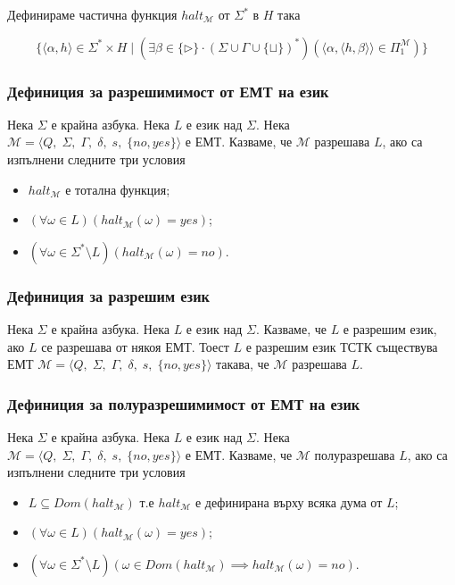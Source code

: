 \documentclass[14pt]{extarticle}
\begin{document}
Дефинираме частична функция \(halt_{\mathcal M}\) от \(\Sigma^*\) в \(H\) така

\[\{ \langle \alpha, h \rangle \in \Sigma^* \times H \mid (\exists \beta \in \{\triangleright\} \cdot (\Sigma \cup \Gamma \cup \{\sqcup\})^*) ( \langle \alpha, \langle h, \beta \rangle \rangle \in \Pi_1^{\mathcal M})  \}\]

\subsubsection*{Дефиниция за разрешимимост от ЕМТ на език}
Нека \(\Sigma\) е крайна азбука.
Нека \(L\) е език над \(\Sigma\).
Нека \(\mathcal M = \langle Q,\; \Sigma,\; \Gamma,\; \delta,\; s,\; \{no, yes\} \rangle\) е ЕМТ.
Казваме, че \(\mathcal M\) разрешава \(L\), ако са изпълнени следните три условия

\begin{itemize}
    \item \(halt_{\mathcal M}\) е тотална функция;
    \item \((\forall \omega \in L)( halt_{\mathcal M}(\omega) = yes )\);
    \item \((\forall \omega \in \Sigma^* \setminus L)( halt_{\mathcal M}(\omega) = no )\).
\end{itemize}

\subsubsection*{Дефиниция за разрешим език}
Нека \(\Sigma\) е крайна азбука.
Нека \(L\) е език над \(\Sigma\).
Казваме, че \(L\) е разрешим език, ако \(L\) се разрешава от някоя ЕМТ.
Тоест \(L\) е разрешим език ТСТК съществува ЕМТ \(\mathcal M = \langle Q,\; \Sigma,\; \Gamma,\; \delta,\; s,\; \{no, yes\} \rangle\) такава, че \(\mathcal M\) разрешава \(L\).

\subsubsection*{Дефиниция за полуразрешимимост от ЕМТ на език}
Нека \(\Sigma\) е крайна азбука.
Нека \(L\) е език над \(\Sigma\).
Нека \(\mathcal M = \langle Q,\; \Sigma,\; \Gamma,\; \delta,\; s,\; \{no, yes\} \rangle\) е ЕМТ.
Казваме, че \(\mathcal M\) полуразрешава \(L\), ако са изпълнени следните три условия

\begin{itemize}
    \item \(L \subseteq Dom(halt_{\mathcal M})\) т.е \(halt_{\mathcal M}\) е дефинирана върху всяка дума от \(L\);
    \item \((\forall \omega \in L)( halt_{\mathcal M}(\omega) = yes )\);
    \item \((\forall \omega \in \Sigma^* \setminus L)(\omega \in Dom(halt_{\mathcal M}) \implies  halt_{\mathcal M}(\omega) = no )\).
\end{itemize}
\end{document}
